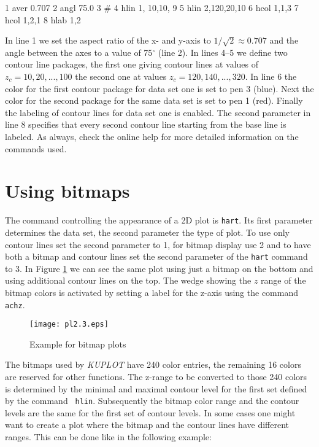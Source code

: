 \begin{MacVerbatim}
      1  aver 0.707
      2  angl 75.0
      3  #
      4  hlin 1, 10,10, 9
      5  hlin 2,120,20,10
      6  hcol 1,1,3
      7  hcol 1,2,1
      8  hlab 1,2
\end{MacVerbatim}

In line 1 we set the aspect ratio of the x- and y-axis to
$1/\sqrt{2} \approx 0.707$ and the angle between the axes to a value
of 75$^{\circ}$ (line 2). In lines 4--5 we define two contour line
packages, the first one giving contour lines at values of $z_{c} =
10, 20, ..., 100$ the second one at values $z_{c} = 120, 140, ...,
320$. In line 6 the color for the first contour package for data set
one is set to pen 3 (blue). Next the color for the second package
for the same data set is set to pen 1 (red). Finally the labeling of
contour lines for data set one is enabled. The second parameter in
line 8 specifies that every second contour line starting from the
base line is labeled. As always, check the online help for more
detailed information on the commands used.


\section{Using bitmaps \label{2d-bitmap}}

The command controlling the appearance of a 2D plot is {\tt hart}.
Its first parameter determines the data set, the second parameter
the type of plot. To use only contour lines set the second parameter
to 1, for bitmap display use 2 and to have both a bitmap and contour
lines set the second parameter of the {\tt hart} command to 3. In
Figure \ref{pl2-fig3} we can see the same plot using just a bitmap
on the bottom and using additional contour lines on the top. The
wedge showing the $z$ range of the bitmap colors is activated by
setting a label for the z-axis using the command {\tt achz}. \par

\begin{figure}[!tbhp]
   \centering
   \texttt{[image: pl2.3.eps]}
   \caption{Example for bitmap plots}
   \label{pl2-fig3}
\end{figure}

The bitmaps used by {\it KUPLOT} have 240 color entries, the
remaining 16 colors are reserved for other functions. The z-range to
be converted to those 240 colors is determined by the minimal and
maximal contour level for the first set defined by the command {\tt
hlin}. Subsequently the bitmap color range and the contour levels
are the same for the first set of contour levels. In some cases one
might want to create a plot where the bitmap and the contour lines
have different ranges. This can be done like in the following
example:

